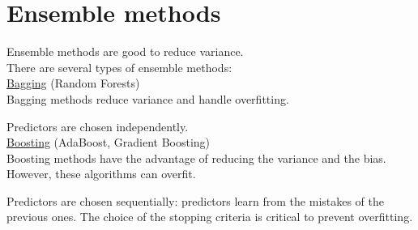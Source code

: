 \section*{Ensemble methods}

\label{sec:ensemble-methods}

Ensemble methods are good to reduce variance. \\

There are several types of ensemble methods:  \\

\underline{Bagging} (Random Forests) \\

Bagging methods reduce variance and handle overfitting.

Predictors are chosen independently. \\

\underline{Boosting} (AdaBoost, Gradient Boosting) \\

Boosting methods have the advantage of reducing the variance and the bias. However, these algorithms can overfit.

Predictors are chosen sequentially: predictors learn from the mistakes of the previous ones. The choice of the stopping criteria is critical to prevent overfitting.

\vspace{5mm}
